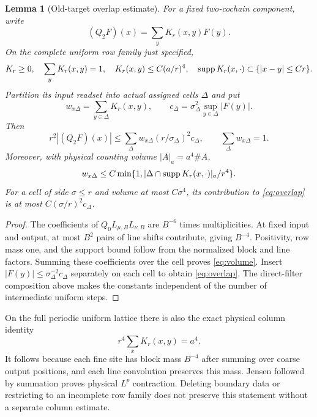 \documentclass[11pt,letterpaper]{article}
\theoremstyle{plain}
\newtheorem{lemma}[theorem]{Lemma}
\theoremstyle{remark}\newtheorem{remark}[theorem]{Scope}
\begin{document}
\begin{lemma}[Old-target overlap estimate]
For a fixed two-cochain component, write
\[
 (Q_2F)(x)=\sum_yK_r(x,y)F(y).
\]
On the complete uniform row family just specified,
\begin{equation}
 K_r\ge0,\quad \sum_yK_r(x,y)=1,\quad
 K_r(x,y)\le C(a/r)^4,\quad
 \operatorname{supp} K_r(x,\cdot)\subset\{|x-y|\le Cr\}.
 \label{eq:kernel}
\end{equation}
Partition its input readset into actual assigned cells $\Delta$ and put
\begin{equation}
 w_{x\Delta}=\sum_{y\in\Delta}K_r(x,y),\qquad
 c_\Delta=\sigma_\Delta^2\sup_{y\in\Delta}|F(y)|.
\end{equation}
Then
\begin{equation}
 r^2|(Q_2F)(x)|
 \le\sum_\Delta w_{x\Delta}(r/\sigma_\Delta)^2c_\Delta,
 \qquad \sum_\Delta w_{x\Delta}=1.
 \label{eq:overlap}
\end{equation}
Moreover, with physical counting volume $|A|_a=a^4\#A$,
\begin{equation}
 w_{x\Delta}
 \le C\min\{1,|\Delta\cap\operatorname{supp} K_r(x,\cdot)|_a/r^4\}.
 \label{eq:volume}
\end{equation}
For a cell of side $\sigma\le r$ and volume at most $C\sigma^4$, its
contribution to \eqref{eq:overlap} is at most $C(\sigma/r)^2c_\Delta$.
\end{lemma}

\begin{proof}
The coefficients of $Q_0L_{\mu,B}L_{\nu,B}$ are $B^{-6}$ times
multiplicities. At fixed input and output, at most $B^2$ pairs of line
shifts contribute, giving $B^{-4}$. Positivity, row mass one, and the
support bound follow from the normalized block and line factors. Summing
these coefficients over the cell proves \eqref{eq:volume}. Insert
$|F(y)|\le\sigma_\Delta^{-2}c_\Delta$ separately on each cell to obtain
\eqref{eq:overlap}. The direct-filter composition above makes the constants
independent of the number of intermediate uniform steps.
\end{proof}

On the full periodic uniform lattice there is also the exact physical
column identity
\begin{equation}
 r^4\sum_xK_r(x,y)=a^4.
\end{equation}
It follows because each fine site has block mass $B^{-4}$ after summing over
coarse output positions, and each line convolution preserves this mass.
Jensen followed by summation proves physical $L^p$ contraction. Deleting
boundary data or restricting to an incomplete row family does not preserve
this statement without a separate column estimate.
\end{document}
